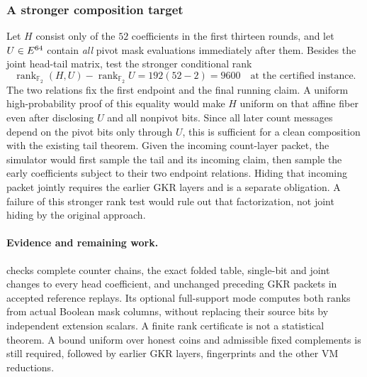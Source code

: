 \subsubsection{A stronger composition target}

Let $H$ consist only of the $52$ coefficients in the first thirteen rounds, and let $U\in E^{64}$ contain \emph{all} pivot mask evaluations immediately after them. Besides the joint head-tail matrix, test the stronger conditional rank
\[
 \operatorname{rank}_{\mathbb F_2}(H,U)
 -\operatorname{rank}_{\mathbb F_2}U
 =192(52-2)=9600
 \quad\text{at the certified instance}.
\]
The two relations fix the first endpoint and the final running claim. A uniform high-probability proof of this equality would make $H$ uniform on that affine fiber even after disclosing $U$ and all nonpivot bits. Since all later count messages depend on the pivot bits only through $U$, this is sufficient for a clean composition with the existing tail theorem. Given the incoming count-layer packet, the simulator would first sample the tail and its incoming claim, then sample the early coefficients subject to their two endpoint relations. Hiding that incoming packet jointly requires the earlier GKR layers and is a separate obligation. A failure of this stronger rank test would rule out that factorization, not joint hiding by the original approach.

\paragraph{Evidence and remaining work.}  checks complete counter chains, the exact folded table, single-bit and joint changes to every head coefficient, and unchanged preceding GKR packets in accepted reference replays. Its optional full-support mode computes both ranks from actual Boolean mask columns, without replacing their source bits by independent extension scalars. A finite rank certificate is not a statistical theorem. A bound uniform over honest coins and admissible fixed complements is still required, followed by earlier GKR layers, fingerprints and the other VM reductions.
